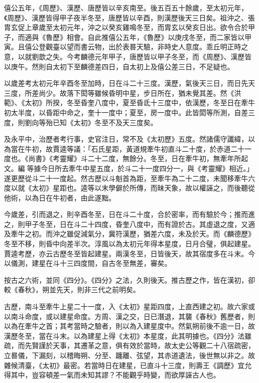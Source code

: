 \begin{pinyinscope}
 僖公五年，《周歷》、漢歷、唐歷皆以辛亥南至。後五百五十餘歲，至太初元年，《周歷》、漢歷皆得甲子夜半冬至，唐歷皆以辛酉，則漢歷後天三日矣。祖沖之、張胄玄促上章歲至太初元年，沖之以癸亥雞鳴冬至，而胄玄以癸亥日出。欲令合於甲子，而適與《魯歷》相會。自此推僖公五年，《魯歷》以庚戌冬至，而二家皆以甲寅。且僖公登觀臺以望而書云物，出於表晷天驗，非時史人意度。乖丘明正時之意，以就劉歆之失。今考麟德元年甲子，唐歷皆以甲子冬至，而《周歷》、漢歷皆以庚午。然則自太初下至麟德差四日，自太初上及僖公差三日，不足疑也。



 以歲差考太初元年辛酉冬至加時，日在斗二十三度。漢歷，氣後天三日，而日先天三度，所差尚少。故落下閎等雖候昏明中星，步日所在，猶未覺其差。然《洪範》、《太初》所揆，冬至昏奎八度中，夏至昏氐十三度中，依漢歷，冬至日在牽牛初太半度，以昏距中命之，奎十一度中；夏至，房一度中。此皆閎等所測，自差三度，則劉向等殆已知《太初》冬至不及天三度矣。



 及永平中，治歷者考行事，史官注日，常不及《太初歷》五度。然諸儒守讖緯，以為當在牛初，故賈逵等議：「石氏星距，黃道規牽牛初直斗二十度，於赤道二十一度也。《尚書》《考靈耀》斗二十二度，無餘分。冬至，日在牽牛初，無牽年所起文。編等據今日所去牽牛中星五度，於斗二十一度四分一，與《考靈耀》相近。」遂更歷從斗二十一度起。然古歷以斗魁首為距，至牽牛為二十二度，未聞移牽牛六度以就《太初》星距也。逵等以末學僻於所傳，而昧天象，故以權誣之，而後聽從他術，以為日在牛初者，由此遂黜。



 今歲差，引而退之，則辛酉冬至，日在斗二十度，合於密率，而有驗於今；推而進之，則甲子冬至，日在斗二十四度，昏奎八度中，而有證於古。其虛退之度，又適及牽牛之初。而沖之雖促減氣分，冀符漢歷，猶差六度，未及於天。而《麟德歷》冬至不移，則昏中向差半次。淳風以為太初元年得本星度，日月合璧，俱起建星。賈逵考歷，亦云古歷冬至皆起建星。兩漢冬至，日皆後天，故其宿度多在斗末。今以儀測，建星在斗十三四度間，自古冬至無差，審矣。



 按古之六術，並同《四分》。《四分》之法，久則後天。推古歷之作，皆在漢初，卻較《春秋》，朔並先天，則非三代之前明矣。



 古歷，南斗至牽牛上星二十一度，入《太初》星距四度，上直西建之初。故六家或以南斗命度，或以建星命度。方周、漢之交，日已潛退，其襲《春秋》舊歷者，則以為在牽牛之首；其考當時之驗者，則以為入建星度中。然氣朔前後不逾一日，故漢歷冬至，當在斗末。以為建星上得《太初》本星度，此其明據也。《四分》法雖疏，而先賢謹於天事，其遷革之意，俱有效於當時，故太史公等觀二十八宿疏密，立晷儀，下漏刻，以稽晦朔、分至、躔離、弦望，其赤道遺法，後世無以非之。故雜候清臺，《太初》最密。若當時日在建星，已直斗十三度，則壽王《調歷》宜允得其中，豈容頓差一氣而未知其謬？不能觀乎時變，而欲厚誣古人也。




\end{pinyinscope}

